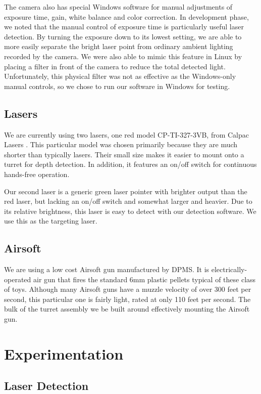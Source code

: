 \documentclass[10pt,twocolumn,letterpaper]{article}
\begin{document}
The camera also has special Windows software for manual adjustments of exposure time, gain, white balance and color correction.  In development phase, we noted that the manual control of exposure time is particularly useful laser detection.  By turning the exposure down to its lowest setting, we are able to more easily separate the bright laser point from ordinary ambient lighting recorded by the camera.  We were also able to mimic this feature in Linux by placing a filter in front of the camera to reduce the total detected light.  Unfortunately, this physical filter was not as effective as the Windows-only manual controls, so we chose to run our software in Windows for testing.

\subsection{Lasers}

We are currently using two lasers, one red model CP-TI-327-3VB, from Calpac Lasers \cite{calpac}.  This particular model was chosen primarily because they are much shorter than typically lasers.  Their small size makes it easier to mount onto a turret for depth detection.  In addition, it features an on/off switch for continuous hands-free operation.

Our second laser is a generic green laser pointer with brighter output than the red laser, but lacking an on/off switch and somewhat larger and heavier.  Due to its relative brightness, this laser is easy to detect with our detection software.  We use this as the targeting laser.

\subsection{Airsoft}

We are using a low cost Airsoft gun manufactured by DPMS. It is electrically-operated air gun that fires the standard 6mm plastic pellets typical of these class of toys. Although many Airsoft guns have a muzzle velocity of over 300 feet per second, this particular one is fairly light, rated at only 110 feet per second. The bulk of the turret assembly we be built around effectively mounting the Airsoft gun.

\section{Experimentation}

\subsection{Laser Detection}
\end{document}
